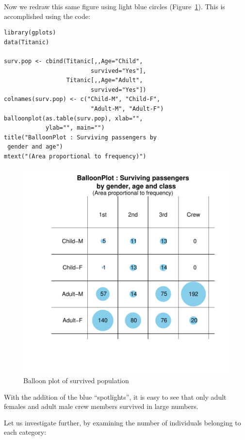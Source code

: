 \documentclass[a4paper]{report}
\begin{document}
\begin{article}
Now we redraw this same figure using light blue circles
(Figure~\ref{figure:Surv.Pop}).  This is accomplished using the code:

{\small
\begin{verbatim}
library(gplots)
data(Titanic)

surv.pop <- cbind(Titanic[,,Age="Child", 
                         survived="Yes"],
                  Titanic[,,Age="Adult", 
                         survived="Yes"])
colnames(surv.pop) <- c("Child-M", "Child-F",
                         "Adult-M", "Adult-F")
balloonplot(as.table(surv.pop), xlab="", 
            ylab="", main="")
title("BalloonPlot : Surviving passengers by
 gender and age")
mtext("(Area proportional to frequency)")
\end{verbatim}
 }

\begin{figure}[h]
\includegraphics[width=\textwidth]{SurvivedPop.pdf}
\vspace{-0.65in}
\caption{\label{figure:Surv.Pop}
Balloon plot of survived population}
\end{figure}

With the addition of the blue ``spotlights'', it is easy to see that
only adult females and adult male crew members survived in large
numbers.

Let us investigate further, by examining the number
of individuals belonging to each category:


\end{article}
\end{document}
